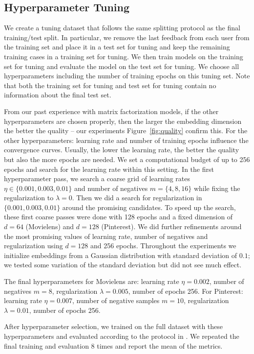 \documentclass{article}
\begin{document}
\subsection{Hyperparameter Tuning}

We create a tuning dataset that follows the same splitting protocol as the final training/test split.
In particular, we remove the last feedback from each user from the training set and place it in a test set for tuning and keep the remaining training cases in a training set for tuning.
We then train models on the training set for tuning and evaluate the model on the test set for tuning.
We choose all hyperparameters including the number of training epochs on this tuning set.
Note that both the training set for tuning and test set for tuning contain no information about the final test set.

From our past experience with matrix factorization models, if the other hyperparameters are chosen properly, then the larger the embedding dimension the better the quality -- our experiments Figure~\ref{fig:quality} confirm this.
For the other hyperparameters: learning rate and number of training epochs influence the convergence curves.
Usually, the lower the learning rate, the better the quality but also the more epochs are needed.
We set a computational budget of up to 256 epochs and search for the learning rate within this setting.
In the first hyperparameter pass, we search a coarse grid of learning rates $\eta \in \{0.001, 0.003, 0.01\}$ and number of negatives $m = \{4,8,16\}$ while fixing the regularization to $\lambda = 0$.
Then we did a search for regularization in $\{0.001, 0.003, 0.01\}$ around the promising candidates.
To speed up the search, these first coarse passes were done with 128 epochs and a fixed dimension of $d=64$ (Movielens) and $d=128$ (Pinterest).
We did further refinements around the most promising values of learning rate, number of negatives and regularization using $d=128$ and 256 epochs.
Throughout the experiments we initialize embeddings from a Gaussian distribution with standard deviation of $0.1$; we tested some variation of the standard deviation but did not see much effect.

The final hyperparameters for Movielens are: learning rate $\eta=0.002$, number of negatives $m=8$, regularization $\lambda=0.005$, number of epochs 256.
For Pinterest: learning rate $\eta=0.007$, number of negative samples $m=10$, regularization $\lambda=0.01$, number of epochs 256.

After hyperparameter selection, we trained on the full dataset with these hyperparameters and evaluated according to the protocol in \cite{he:www17}.
We repeated the final training and evaluation 8 times and report the mean of the metrics.
\end{document}
